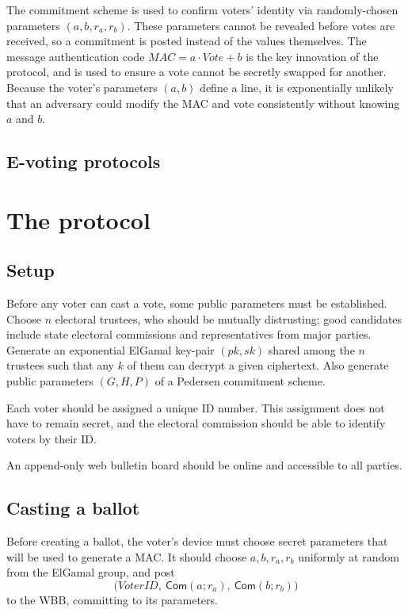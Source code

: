 \documentclass[11pt,twoside,a4paper]{article}
\newcommand{\commit}{\mathsf{Com}}
\theoremstyle{definition}
\newcommand{\Vote}{\mathit{Vote}}
\newcommand{\VoterID}{\mathit{VoterID}}
\newcommand{\Mac}{\mathit{MAC}}
\begin{document}
The commitment scheme is used to confirm voters' identity via randomly-chosen parameters \((a, b, r_a, r_b)\). These parameters cannot be revealed before votes are received, so a commitment is posted instead of the values themselves. The message authentication code \(\Mac = a\cdot \Vote+b\) is the key innovation of the protocol, and is used to ensure a vote cannot be secretly swapped for another. Because the voter's parameters \((a, b)\) define a line, it is exponentially unlikely that an adversary could modify the MAC and vote consistently without knowing \(a\) and \(b\).
\subsection{E-voting protocols}
\section{The protocol}\label{sec-protocol}
\subsection{Setup}
Before any voter can cast a vote, some public parameters must be established. Choose \(n\) electoral trustees, who should be mutually distrusting; good candidates include state electoral commissions and representatives from major parties. Generate an exponential ElGamal key-pair \((pk, sk)\) shared among the \(n\) trustees such that any \(k\) of them can decrypt a given ciphertext. Also generate public parameters \((G, H, P)\) of a Pedersen commitment scheme.

Each voter should be assigned a unique ID number. This assignment does not have to remain secret, and the electoral commission should be able to identify voters by their ID.

An append-only web bulletin board should be online and accessible to all parties.
\subsection{Casting a ballot}
Before creating a ballot, the voter's device must choose secret parameters that will be used to generate a MAC. It should choose \(a,b,r_a,r_b\) uniformly at random from the ElGamal group, and post
\[\big(\VoterID,\ \commit(a;r_a),\ \commit(b;r_b)\big)\]
to the WBB, committing to its parameters.
\end{document}
